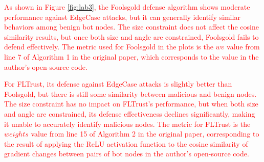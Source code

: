 \documentclass[lettersize,journal]{IEEEtran}
\begin{document}

\textcolor{red}{As shown in Figure \ref{fig:lab3}, the Foolsgold defense algorithm shows moderate performance against EdgeCase attacks, but it can generally identify similar behaviors among benign bot nodes. The size constraint does not affect the cosine similarity results, but once both size and angle are constrained, Foolsgold fails to defend effectively. The metric used for Foolsgold in the plots is the $wv$ value from line 7 of Algorithm 1 in the original paper, which corresponds to the value in the author's open-source code.}

\textcolor{red}{For FLTrust, its defense against EdgeCase attacks is slightly better than Foolsgold, but there is still some similarity between malicious and benign nodes. The size constraint has no impact on FLTrust's performance, but when both size and angle are constrained, its defense effectiveness declines significantly, making it unable to accurately identify malicious nodes. The metric for FLTrust is the $weights$ value from line 15 of Algorithm 2 in the original paper, corresponding to the result of applying the ReLU activation function to the cosine similarity of gradient changes between pairs of bot nodes in the author's open-source code.}
\end{document}
